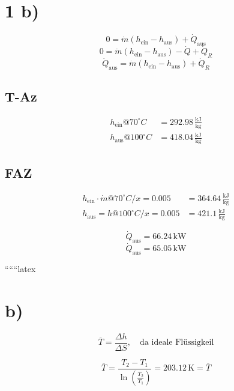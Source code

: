 \section*{1 b)}
\begin{equation}
0 = \dot{m} (h_{\text{ein}} - h_{\text{aus}}) + \dot{Q}_{\text{aus}}
\end{equation}
\begin{equation}
0 = \dot{m} (h_{\text{ein}} - h_{\text{aus}}) - \dot{Q} + \dot{Q}_R
\end{equation}
\begin{equation}
\dot{Q}_{\text{aus}} = \dot{m} (h_{\text{ein}} - h_{\text{aus}}) + \dot{Q}_R
\end{equation}

\subsection*{T-Az}
\begin{align*}
h_{\text{ein}} @ 70^\circ C &= 292.98 \, \frac{\text{kJ}}{\text{kg}} \\
h_{\text{aus}} @ 100^\circ C &= 418.04 \, \frac{\text{kJ}}{\text{kg}}
\end{align*}

\subsection*{FAZ}
\begin{align*}
h_{\text{ein}} \cdot \dot{m} @ 70^\circ C / x = 0.005 &= 364.64 \, \frac{\text{kJ}}{\text{kg}} \\
h_{\text{aus}} = h @ 100^\circ C / x = 0.005 &= 421.1 \, \frac{\text{kJ}}{\text{kg}}
\end{align*}

\begin{equation}
\dot{Q}_{\text{aus}} = 66.24 \, \text{kW}
\end{equation}
\begin{equation}
\dot{Q}_{\text{aus}} = 65.05 \, \text{kW}
\end{equation}

``````latex



\section*{b)}

\[
\overline{T} = \frac{\Delta h}{\Delta S}, \quad \text{da ideale Flüssigkeil}
\]

\[
\overline{T} = \frac{T_2 - T_1}{\ln \left( \frac{T_2}{T_1} \right)} = \boxed{203.12 \, \text{K} = \overline{T}}
\]